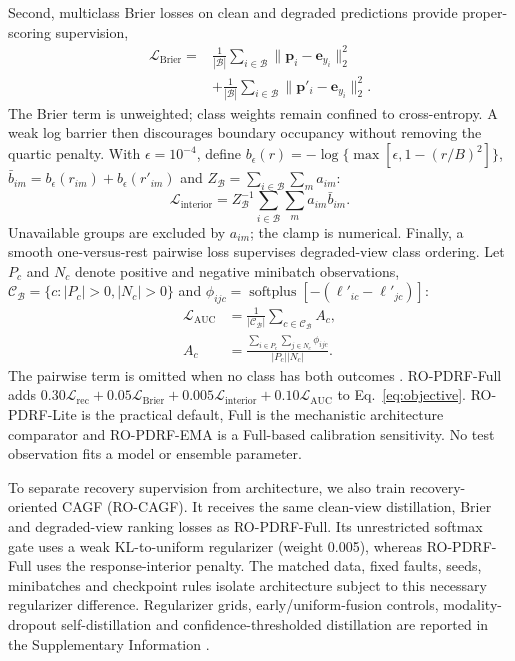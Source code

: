 \documentclass[11pt]{article}
\begin{document}
Second, multiclass Brier losses on clean and degraded predictions provide proper-scoring supervision,
\begin{equation}
\begin{aligned}
\mathcal L_{\mathrm{Brier}}={}&\frac{1}{|\mathcal B|}\sum_{i\in\mathcal B}\|\mathbf p_i-\mathbf e_{y_i}\|_2^2\\
&+\frac{1}{|\mathcal B|}\sum_{i\in\mathcal B}\|\mathbf p'_i-\mathbf e_{y_i}\|_2^2.
\end{aligned}
\end{equation}
The Brier term is unweighted; class weights remain confined to cross-entropy. A weak log barrier then discourages boundary occupancy without removing the quartic penalty. With $\epsilon=10^{-4}$, define $b_\epsilon(r)=-\log\{\max[\epsilon,1-(r/B)^2]\}$, $\bar b_{im}=b_\epsilon(r_{im})+b_\epsilon(r'_{im})$ and $Z_{\mathcal B}=\sum_{i\in\mathcal B}\sum_m a_{im}$:
\begin{equation}
\mathcal L_{\mathrm{interior}}=Z_{\mathcal B}^{-1}
\sum_{i\in\mathcal B}\sum_m a_{im}\bar b_{im}.
\label{eq:interior}
\end{equation}
Unavailable groups are excluded by $a_{im}$; the clamp is numerical. Finally, a smooth one-versus-rest pairwise loss supervises degraded-view class ordering. Let $P_c$ and $N_c$ denote positive and negative minibatch observations, $\mathcal C_{\mathcal B}=\{c:|P_c|>0,|N_c|>0\}$ and $\phi_{ijc}=\operatorname{softplus}[-(\ell'_{ic}-\ell'_{jc})]$:
\begin{equation}
\begin{aligned}
\mathcal L_{\mathrm{AUC}}&=\frac{1}{|\mathcal C_{\mathcal B}|}\sum_{c\in\mathcal C_{\mathcal B}}A_c,\\
A_c&=\frac{\sum_{i\in P_c}\sum_{j\in N_c}\phi_{ijc}}{|P_c||N_c|}.
\end{aligned}
\label{eq:auc}
\end{equation}
The pairwise term is omitted when no class has both outcomes \citep{yang2021pairwise}. RO-PDRF-Full adds $0.30\mathcal L_{\mathrm{rec}}+0.05\mathcal L_{\mathrm{Brier}}+0.005\mathcal L_{\mathrm{interior}}+0.10\mathcal L_{\mathrm{AUC}}$ to Eq.~\eqref{eq:objective}. RO-PDRF-Lite is the practical default, Full is the mechanistic architecture comparator and RO-PDRF-EMA is a Full-based calibration sensitivity. No test observation fits a model or ensemble parameter.

To separate recovery supervision from architecture, we also train recovery-oriented CAGF (RO-CAGF). It receives the same clean-view distillation, Brier and degraded-view ranking losses as RO-PDRF-Full. Its unrestricted softmax gate uses a weak KL-to-uniform regularizer (weight 0.005), whereas RO-PDRF-Full uses the response-interior penalty. The matched data, fixed faults, seeds, minibatches and checkpoint rules isolate architecture subject to this necessary regularizer difference. Regularizer grids, early/uniform-fusion controls, modality-dropout self-distillation and confidence-thresholded distillation are reported in the Supplementary Information \citep{neverova2016moddrop,li2024umdf}.
\end{document}
